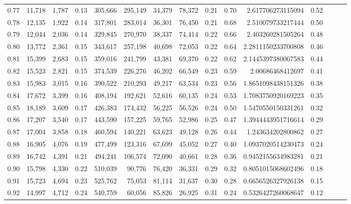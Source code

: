 \begin{tabular}{rrrrrrrrrrrrrrr}
0.77 &  11,718 &  1,787 &  0.13 &  305,666 &  295,149 &   34,379 &   78,372 &  0.21 &  0.70 &     2.617706273115094 &      0.52 \\
0.78 &  12,135 &  1,922 &  0.14 &  317,801 &  283,014 &   36,301 &   76,450 &  0.21 &  0.68 &     2.510079733217444 &      0.50 \\
0.79 &  12,044 &  2,036 &  0.14 &  329,845 &  270,970 &   38,337 &   74,414 &  0.22 &  0.66 &     2.403260281505264 &      0.48 \\
0.80 &  13,772 &  2,361 &  0.15 &  343,617 &  257,198 &   40,698 &   72,053 &  0.22 &  0.64 &    2.2811150233700808 &      0.46 \\
0.81 &  15,399 &  2,683 &  0.15 &  359,016 &  241,799 &   43,381 &   69,370 &  0.22 &  0.62 &    2.1445397380067583 &      0.44 \\
0.82 &  15,523 &  2,821 &  0.15 &  374,539 &  226,276 &   46,202 &   66,549 &  0.23 &  0.59 &      2.00686468412697 &      0.41 \\
0.83 &  15,983 &  3,015 &  0.16 &  390,522 &  210,293 &   49,217 &   63,534 &  0.23 &  0.56 &    1.8651098438151326 &      0.38 \\
0.84 &  17,672 &  3,399 &  0.16 &  408,194 &  192,621 &   52,616 &   60,135 &  0.24 &  0.53 &    1.7083750920169223 &      0.35 \\
0.85 &  18,189 &  3,609 &  0.17 &  426,383 &  174,432 &   56,225 &   56,526 &  0.24 &  0.50 &    1.5470550150331261 &      0.32 \\
0.86 &  17,207 &  3,540 &  0.17 &  443,590 &  157,225 &   59,765 &   52,986 &  0.25 &  0.47 &    1.3944443951716614 &      0.29 \\
0.87 &  17,004 &  3,858 &  0.18 &  460,594 &  140,221 &   63,623 &   49,128 &  0.26 &  0.44 &     1.243634202800862 &      0.27 \\
0.88 &  16,905 &  4,076 &  0.19 &  477,499 &  123,316 &   67,699 &   45,052 &  0.27 &  0.40 &    1.0937020514230473 &      0.24 \\
0.89 &  16,742 &  4,391 &  0.21 &  494,241 &  106,574 &   72,090 &   40,661 &  0.28 &  0.36 &    0.9452155634983281 &      0.21 \\
0.90 &  15,798 &  4,330 &  0.22 &  510,039 &   90,776 &   76,420 &   36,331 &  0.29 &  0.32 &    0.8051015068602496 &      0.18 \\
0.91 &  15,723 &  4,694 &  0.23 &  525,762 &   75,053 &   81,114 &   31,637 &  0.30 &  0.28 &    0.6656526327926138 &      0.15 \\
0.92 &  14,997 &  4,712 &  0.24 &  540,759 &   60,056 &   85,826 &   26,925 &  0.31 &  0.24 &    0.5326427260068647 &      0.12 \\

\end{tabular}

